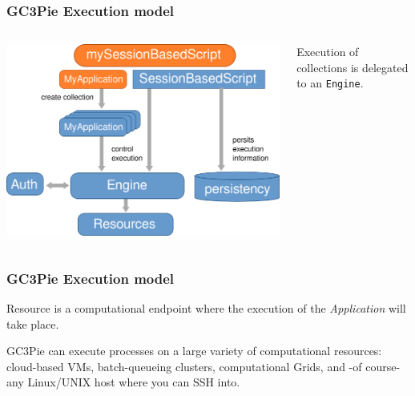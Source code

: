 \documentclass[english,serif,mathserif,xcolor=pdftex,dvipsnames,table]{beamer}
\begin{document}
\begin{frame}
  \frametitle{GC3Pie Execution model}
  \begin{columns}
      \includegraphics[width=1\textwidth]{fig/GC3Pie_execution_model}
  \begin{block}{}
    Execution of collections is delegated to an \texttt{Engine}.
  \end{block}

  \end{columns}
\end{frame}

\begin{frame}
  \frametitle{GC3Pie Execution model}
  \begin{block}{Resource}
    is a {\color{Blue}computational endpoint} where the
    {\color{Blue}execution} of the {\it Application} will take place.
  \end{block}
  \begin{block}{}
    GC3Pie can execute processes on a large variety of computational
    resources:
    {\color{Blue}cloud-based} VMs, {\color{Blue}batch-queueing}
    clusters, computational {\color{Blue}Grids}, and -of course- any
    Linux/UNIX host where you can {\color{Blue}SSH} into.

  \end{block}
\end{frame}
\end{document}
